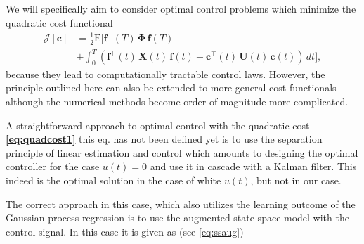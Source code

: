 \documentclass[journal]{IEEEtran}
\newcommand{\mauricio}[1]{{\color{blue}#1}}
\begin{document}
We will specifically aim to consider optimal control problems which minimize the quadratic cost functional
%
\begin{equation}
\begin{split}
  \mathcal{J}[\mathbf{c}] &= \frac{1}{2} \mathrm{E} \Big[
    \mathbf{f}^{\top}(T) \, \boldsymbol{\Phi} \, \mathbf{f}(T) \\
   &+ \int_0^T
   (\mathbf{f}^{\top}(t) \, \mathbf{X}(t) \, \mathbf{f}(t)
  + \mathbf{c}^{\top}(t) \, \mathbf{U}(t) \, \mathbf{c}(t)) \, dt \Big],
\end{split}
\label{eq:quadcost1}
\end{equation}
%
because they lead to computationally tractable control laws. However, the principle outlined here can also be extended to more general cost functionals although the numerical methods become order of magnitude more complicated.

A straightforward approach to optimal control with the quadratic cost \mauricio{\textbf{\eqref{eq:quadcost1}} this
  eq. has not been defined yet} is to use the separation principle of linear estimation and control which amounts to designing the optimal controller for the case $u(t) = 0$ and use it in cascade with a Kalman filter. This indeed is the optimal solution in the case of white $u(t)$, but not in our case.

The correct approach in this case, which also utilizes the learning outcome of the Gaussian process regression is to use the augmented state space model with the control signal. In this case it is given as (see \eqref{eq:ssaug})
\end{document}
